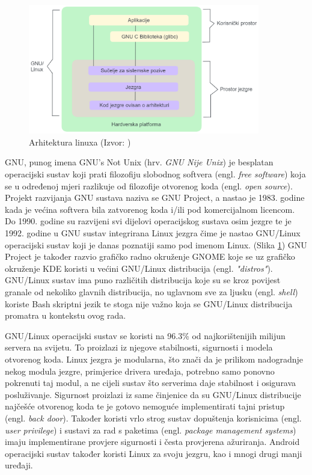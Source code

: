 \documentclass{foi}
\begin{document}
\begin{figure}[ht!]
    \centering
    \includegraphics[width=0.9\textwidth]{slike/Arhitektura_linuxa.png}
    \caption{Arhitektura linuxa (Izvor: \citeauthor{Arhitektura})}
    \label{fig:arhitektura}
\end{figure}

GNU, punog imena GNU's Not Unix (hrv. \textit{GNU Nije Unix}) je besplatan operacijski sustav koji prati filozofiju slobodnog softvera (engl. \textit{free software}) koja se u određenoj mjeri razlikuje od filozofije otvorenog koda (engl. \textit{open source}). Projekt razvijanja GNU sustava naziva se GNU Project, a nastao je 1983. godine kada je većina softvera bila zatvorenog koda i/ili pod komercijalnom licencom. Do 1990. godine su razvijeni svi dijelovi operacijskog sustava osim jezgre te je 1992. godine u GNU sustav integrirana Linux jezgra čime je nastao GNU/Linux operacijski sustav koji je danas poznatiji samo pod imenom Linux. (Slika \ref{fig:arhitektura}) GNU Project je također razvio grafičko radno okruženje GNOME koje se uz grafičko okruženje KDE koristi u većini GNU/Linux distribucija (engl. \textit{"distros"}).\cite{GNU} GNU/Linux sustav ima puno različitih distribucija koje su se kroz povijest granale od nekoliko glavnih distribucija, no uglavnom sve za ljusku (engl. \textit{shell}) koriste Bash skriptni jezik te stoga nije važno koja se GNU/Linux distribucija promatra u kontekstu ovog rada.

GNU/Linux operacijski sustav se koristi na 96.3\% od najkorištenijih milijun servera na svijetu.\cite{Statistika} To proizlazi iz njegove stabilnosti, sigurnosti i modela otvorenog koda. Linux jezgra je modularna, što znači da je prilikom nadogradnje nekog modula jezgre, primjerice drivera uređaja, potrebno samo ponovno pokrenuti taj modul, a ne cijeli sustav što serverima daje stabilnost i osigurava posluživanje.\cite{Modularnost} Sigurnost proizlazi iz same činjenice da su GNU/Linux distribucije najčešće otvorenog koda te je gotovo nemoguće implementirati tajni pristup (engl. \textit{back door}). Također koristi vrlo strog sustav dopuštenja korisnicima (engl. \textit{user privilege}) i sustavi za rad s paketima (engl. \textit{package management systems}) imaju implementirane provjere sigurnosti i česta provjerena ažuriranja.\cite{Sigurnost} Android operacijski sustav također koristi Linux za svoju jezgru, kao i mnogi drugi manji uređaji.
\end{document}
